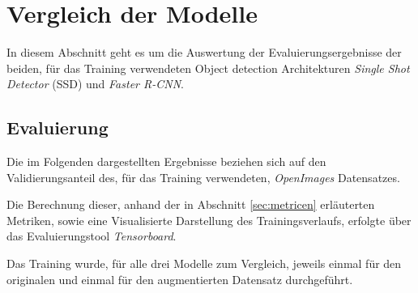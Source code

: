 \section{Vergleich der Modelle}\label{sec:model_vergleich}

In diesem Abschnitt geht es um die Auswertung 
der Evaluierungsergebnisse der beiden, für das Training 
verwendeten Object detection Architekturen \textit{Single
Shot Detector} (SSD) und \textit{Faster R-CNN}.


\subsection{Evaluierung}

Die im Folgenden dargestellten Ergebnisse beziehen sich auf 
den Validierungsanteil des, für das Training verwendeten, 
\textit{OpenImages} Datensatzes.

Die Berechnung dieser, anhand der in Abschnitt
 \ref{sec:metricen} erläuterten Metriken, sowie 
eine Visualisierte Darstellung 
des Trainingsverlaufs, erfolgte
über das Evaluierungstool \textit{Tensorboard}.

Das Training wurde, für alle drei Modelle
zum Vergleich, jeweils einmal für den originalen
und einmal für den augmentierten Datensatz durchgeführt.

